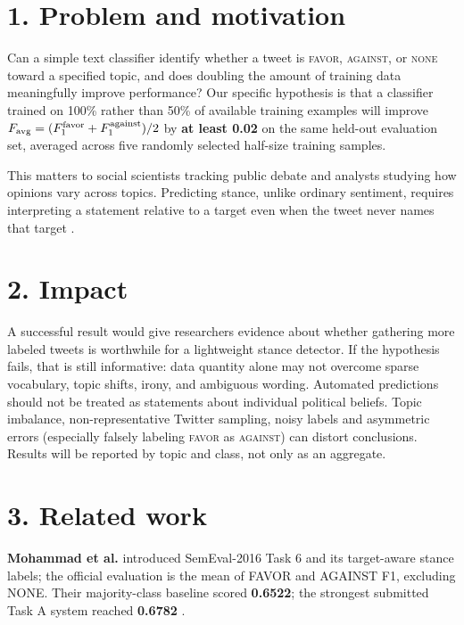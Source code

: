 \documentclass[9pt,twocolumn]{extarticle}
\begin{document}
\section*{1. Problem and motivation}

Can a simple text classifier identify whether a tweet is \textsc{favor}, \textsc{against}, or \textsc{none} toward a specified topic, and does doubling the amount of training data meaningfully improve performance? Our specific hypothesis is that a classifier trained on 100\% rather than 50\% of available training examples will improve $F_{\mathrm{avg}}=(F_1^{\rm favor}+F_1^{\rm against})/2$ by \textbf{at least 0.02} on the same held-out evaluation set, averaged across five randomly selected half-size training samples.

This matters to social scientists tracking public debate and analysts studying how opinions vary across topics. Predicting stance, unlike ordinary sentiment, requires interpreting a statement relative to a target even when the tweet never names that target \cite{mohammad2016}.
\section*{2. Impact}
A successful result would give researchers evidence about whether gathering more labeled tweets is worthwhile for a lightweight stance detector. If the hypothesis fails, that is still informative: data quantity alone may not overcome sparse vocabulary, topic shifts, irony, and ambiguous wording. Automated predictions should not be treated as statements about individual political beliefs. Topic imbalance, non-representative Twitter sampling, noisy labels and asymmetric errors (especially falsely labeling \textsc{favor} as \textsc{against}) can distort conclusions. Results will be reported by topic and class, not only as an aggregate.
\section*{3. Related work}
\textbf{Mohammad et al.} introduced SemEval-2016 Task 6 and its target-aware stance labels; the official evaluation is the mean of FAVOR and AGAINST F1, excluding NONE. Their majority-class baseline scored \textbf{0.6522}; the strongest submitted Task A system reached \textbf{0.6782} \cite{mohammad2016}.
\end{document}
